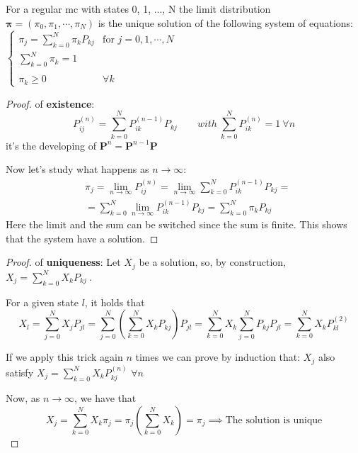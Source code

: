	\begin{theorem}
		For a regular \gls{mc} with states 0, 1, ..., N the limit distribution $\bm\pi = (\pi_0,\pi_1,\cdots,\pi_N)$ is the unique solution of the following system of equations:\\

		$\begin{cases}
			\pi_j = \sum\limits_{k=0}^N \pi_k P_{k j} & \text{for } j = 0,1, \cdots, N \\
			\sum\limits_{k=0}^N \pi_k = 1\\
			\\ \pi_k \ge 0 & \forall k
		\end{cases}$
	\end{theorem}

	\begin{proof} of \textbf{existence}:
		\begin{equation}
  			P_{i j}^{(n)} = \sum\limits_{k=0}^N P_{ik}^{(n-1)} P_{k j}
			\qquad with ~\sum\limits_{k=0}^N P_{ik}^{(n)} = 1 ~\forall n
		\end{equation}
		it's the developing of $\bm P^n = \bm P^{n-1} \bm P$

		Now let's study what happens as $ n \to \infty $:
		\begin{equation}
			\begin{split}
				&\pi_j = \lim_{n \to \infty} P_{ij}^{(n)} = \lim_{n \to \infty} \sum\limits_{k=0}^N P_{ik}^{(n-1)} P_{k j
				} =\\
				&= \sum\limits_{k=0}^N \lim_{n \to \infty} P_{ik}^{(n-1)} P_{k j
				} = \sum\limits_{k=0}^N \pi_k P_{kj}
			\end{split}
		\end{equation}
		Here the limit and the sum can be switched since the sum is finite.
		This shows that the system have a solution.
	\end{proof}

	\begin{proof} of \textbf{uniqueness}:
		Let $X_j$ be a solution, so, by construction, $X_j = \sum\limits_{k=0}^N X_k P_{kj} ~$.

		For a given state $l$, it holds that
		\begin{equation}
				X_l = \sum\limits_{j=0}^N X_j P_{jl} =  \sum\limits_{j=0}^N \left( \sum\limits_{k=0}^N X_k P_{kj} \right) P_{jl} =  \sum\limits_{k=0}^N X_k \sum\limits_{j=0}^N P_{kj} P_{jl} = \sum\limits_{k=0}^N X_k P_{kl}^{(2)}
		\end{equation}

		If we apply this trick again $n$ times we can prove by induction that:
		$X_j$ also satisfy $ X_j = \sum\limits_{k=0}^N X_k P_{kj}^{(n)} $ \quad  $\forall n $

		Now, as $n \to \infty$, we have that
		\begin{equation}
			X_j = \sum\limits_{k=0}^N X_k \pi_j = \pi_j \left(\sum\limits_{k=0}^N X_k\right) = \pi_j  \implies
			\text{The solution is unique}
		\end{equation}
	\end{proof}

